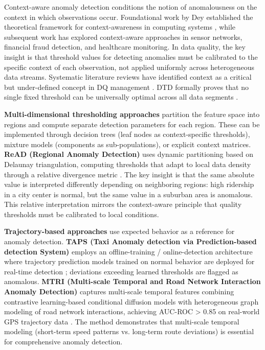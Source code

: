Context-aware anomaly detection conditions the notion of anomalousness on the context in which observations occur. Foundational work by Dey established the theoretical framework for context-awareness in computing systems \citep{dey2001understanding}, while subsequent work has explored context-aware approaches in sensor networks, financial fraud detection, and healthcare monitoring. In data quality, the key insight is that threshold values for detecting anomalies must be calibrated to the specific context of each observation, not applied uniformly across heterogeneous data streams. Systematic literature reviews have identified context as a critical but under-defined concept in DQ management \citep{contextdq2022}. DTD formally proves that no single fixed threshold can be universally optimal across all data segments \citep{dtd2026}.

\textbf{Multi-dimensional thresholding approaches} partition the feature space into regions and compute separate detection parameters for each region. These can be implemented through decision trees (leaf nodes as context-specific thresholds), mixture models (components as sub-populations), or explicit context matrices. \textbf{ReAD (Regional Anomaly Detection)} uses dynamic partitioning based on Delaunay triangulation, computing thresholds that adapt to local data density through a relative divergence metric \citep{read2020}. The key insight is that the same absolute value is interpreted differently depending on neighboring regions: high ridership in a city center is normal, but the same value in a suburban area is anomalous. This relative interpretation mirrors the context-aware principle that quality thresholds must be calibrated to local conditions.

\textbf{Trajectory-based approaches} use expected behavior as a reference for anomaly detection. \textbf{TAPS (Taxi Anomaly detection via Prediction-based detection System)} employs an offline-training / online-detection architecture where trajectory prediction models trained on normal behavior are deployed for real-time detection \citep{taps2021}; deviations exceeding learned thresholds are flagged as anomalous. \textbf{MTRI (Multi-scale Temporal and Road Network Interaction Anomaly Detection)} captures multi-scale temporal features combining contrastive learning-based conditional diffusion models with heterogeneous graph modeling of road network interactions, achieving AUC-ROC > 0.85 on real-world GPS trajectory data \citep{mtri2026}. The method demonstrates that multi-scale temporal modeling (short-term speed patterns vs. long-term route deviations) is essential for comprehensive anomaly detection.

